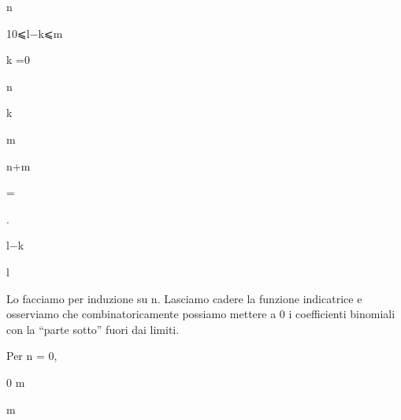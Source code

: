 \documentclass[a4paper,portrait,12pt]{article}
\begin{document}
\begin{flushleft}
n
\end{flushleft}





\begin{flushleft}
10⩽l$-$k⩽m
\end{flushleft}


\begin{flushleft}
k =0
\end{flushleft}





\begin{flushleft}
n
\end{flushleft}


\begin{flushleft}
k
\end{flushleft}





\begin{flushleft}
m
\end{flushleft}


\begin{flushleft}
n+m
\end{flushleft}


=


.


\begin{flushleft}
l$-$k
\end{flushleft}


\begin{flushleft}
l
\end{flushleft}





\begin{flushleft}
Lo facciamo per induzione su n. Lasciamo cadere la funzione indicatrice e osserviamo che combinatoricamente possiamo mettere a 0 i coefficienti binomiali con la {``}parte sotto'' fuori dai limiti.
\end{flushleft}


\begin{flushleft}
Per n = 0,
\end{flushleft}


\begin{flushleft}
0 m
\end{flushleft}


\begin{flushleft}
m
\end{flushleft}
\end{document}
